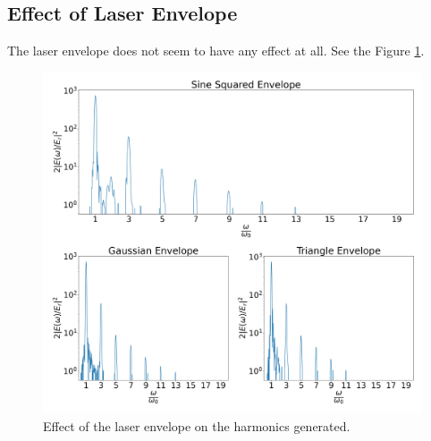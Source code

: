 \documentclass[12pt]{article}
\newenvironment{changemargin}[2]{
\begin{list}{}{
\setlength{\topsep}{0pt}
\setlength{\leftmargin}{#1}
\setlength{\rightmargin}{#2}
\setlength{\listparindent}{\parindent}
\setlength{\itemindent}{\parindent}
\setlength{\parsep}{\parskip}
}
\item[]}{\end{list}}
\begin{document}
\begin{changemargin}{-2cm}{-2cm}
    \subsection{Effect of Laser Envelope}
    The laser envelope does not seem to have any effect at all. See the Figure \ref{fig:env}.
    \begin{figure}[h]
        \centering
        \includegraphics[width=1.0\textwidth, height=0.8\textwidth]{images/env.jpg}
        \caption{Effect of the laser envelope on the harmonics generated.}
        \label{fig:env}
    \end{figure}


\end{changemargin}
\end{document}
